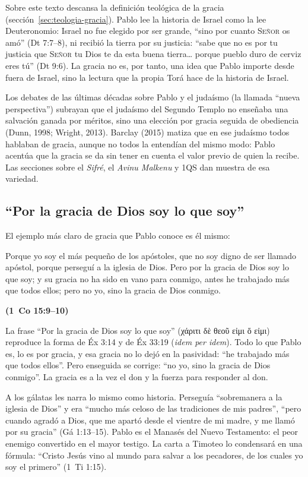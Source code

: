\documentclass[11pt,letterpaper]{article}
\newcommand{\grc}[1]{\foreignlanguage{ancientgreek}{#1}}
\newcommand{\SENOR}{\textsc{Señor}}
\newcommand{\fuente}[1]{\par\hfill{\upshape\bfseries\small\textcolor{azul}{#1}}}
\begin{document}
Sobre este texto descansa la definición teológica de la gracia (sección~\ref{sec:teologia-gracia}). Pablo lee la historia de Israel como la lee Deuteronomio: Israel no fue elegido por ser grande, ``sino por cuanto \SENOR{} os amó'' (Dt 7:7--8), ni recibió la tierra por su justicia: ``sabe que no es por tu justicia que \SENOR{} tu Dios te da esta buena tierra\ldots{} porque pueblo duro de cerviz eres tú'' (Dt 9:6). La gracia no es, por tanto, una idea que Pablo importe desde fuera de Israel, sino la lectura que la propia Torá hace de la historia de Israel.

\begin{nota}[Precisión]
Los debates de las últimas décadas sobre Pablo y el judaísmo (la llamada ``nueva perspectiva'') subrayan que el judaísmo del Segundo Templo no enseñaba una salvación ganada por méritos, sino una elección por gracia seguida de obediencia (Dunn, 1998; Wright, 2013). Barclay (2015) matiza que en ese judaísmo todos hablaban de gracia, aunque no todos la entendían del mismo modo: Pablo acentúa que la gracia se da sin tener en cuenta el valor previo de quien la recibe. Las secciones sobre el \emph{Sifré}, el \emph{Avinu Malkenu} y 1QS dan muestra de esa variedad.
\end{nota}

\subsection{``Por la gracia de Dios soy lo que soy''}
El ejemplo más claro de gracia que Pablo conoce es él mismo:

\begin{cita}Porque yo soy el más pequeño de los apóstoles, que no soy digno de ser llamado apóstol, porque perseguí a la iglesia de Dios. Pero por la gracia de Dios soy lo que soy; y su gracia no ha sido en vano para conmigo, antes he trabajado más que todos ellos; pero no yo, sino la gracia de Dios conmigo.\fuente{(1~Co 15:9--10)}\end{cita}

La frase ``Por la gracia de Dios soy lo que soy'' (\grc{χάριτι δὲ θεοῦ εἰμι ὅ εἰμι}) reproduce la forma de Éx 3:14 y de Éx 33:19 (\emph{idem per idem}). Todo lo que Pablo es, lo es por gracia, y esa gracia no lo dejó en la pasividad: ``he trabajado más que todos ellos''. Pero enseguida se corrige: ``no yo, sino la gracia de Dios conmigo''. La gracia es a la vez el don y la fuerza para responder al don.

A los gálatas les narra lo mismo como historia. Perseguía ``sobremanera a la iglesia de Dios'' y era ``mucho más celoso de las tradiciones de mis padres'', ``pero cuando agradó a Dios, que me apartó desde el vientre de mi madre, y me llamó por su gracia'' (Gá 1:13--15). Pablo es el Manasés del Nuevo Testamento: el peor enemigo convertido en el mayor testigo. La carta a Timoteo lo condensará en una fórmula: ``Cristo Jesús vino al mundo para salvar a los pecadores, de los cuales yo soy el primero'' (1~Ti 1:15).
\end{document}
